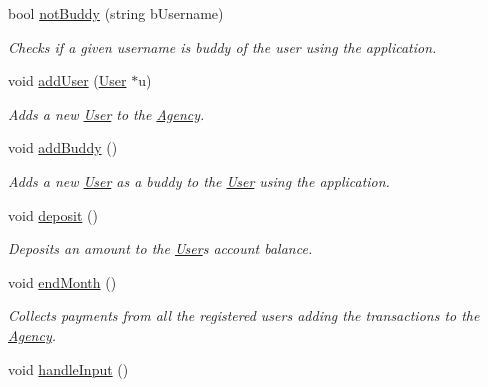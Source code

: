 \begin{Indent}
\begin{DoxyCompactItemize}
bool \hyperlink{class_agency_a9cbd4d4f5f20f6ec9e3d3088cf61f96a}{not\+Buddy} (string b\+Username)
\begin{DoxyCompactList}\small\item\em Checks if a given username is buddy of the user using the application. \end{DoxyCompactList}\item 
void \hyperlink{class_agency_a9307d4ce4dd311f5744592248be6c9e5}{add\+User} (\hyperlink{class_user}{User} $\ast$u)
\begin{DoxyCompactList}\small\item\em Adds a new \hyperlink{class_user}{User} to the \hyperlink{class_agency}{Agency}. \end{DoxyCompactList}\item 
\mbox{\label{class_agency_a56bbae6923a8e9414085ffb23e644d53}} 
void \hyperlink{class_agency_a56bbae6923a8e9414085ffb23e644d53}{add\+Buddy} ()
\begin{DoxyCompactList}\small\item\em Adds a new \hyperlink{class_user}{User} as a buddy to the \hyperlink{class_user}{User} using the application. \end{DoxyCompactList}\item 
\mbox{\label{class_agency_aa76bfa288699a10c82a04db205bc56d6}} 
void \hyperlink{class_agency_aa76bfa288699a10c82a04db205bc56d6}{deposit} ()
\begin{DoxyCompactList}\small\item\em Deposits an amount to the \hyperlink{class_user}{User}\textquotesingle{}s account balance. \end{DoxyCompactList}\item 
\mbox{\label{class_agency_a69f9b0bc4960edabb2c3342586069da2}} 
void \hyperlink{class_agency_a69f9b0bc4960edabb2c3342586069da2}{end\+Month} ()
\begin{DoxyCompactList}\small\item\em Collects payments from all the registered users adding the transactions to the \hyperlink{class_agency}{Agency}. \end{DoxyCompactList}\item 
\mbox{\label{class_agency_af0d57adbab935cd35d4e49f29e4abc0c}} 
void \hyperlink{class_agency_af0d57adbab935cd35d4e49f29e4abc0c}{handle\+Input} ()

\end{DoxyCompactItemize}
\end{Indent}
